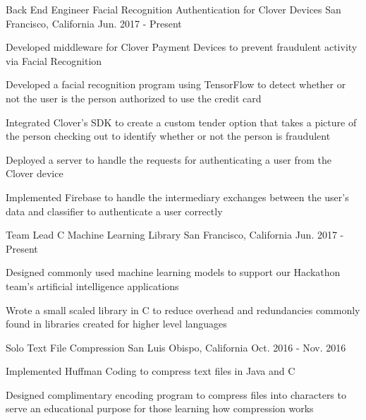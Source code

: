 \begin{cventries}


\cventry
{Back End Engineer} %
{Facial Recognition Authentication for Clover Devices} %
{San Francisco, California} %
{Jun. 2017 - Present} %
{ %
\begin{cvitems}
\item {Developed middleware for Clover Payment Devices to prevent fraudulent activity via Facial Recognition}
\item {Developed a facial recognition program using TensorFlow to detect whether or not the user is the person authorized to use the credit card}
\item {Integrated Clover's SDK to create a custom tender option that takes a picture of the person checking out to identify whether or not the person is fraudulent}
\item {Deployed a server to handle the requests for authenticating a user from the Clover device}
\item {Implemented Firebase to handle the intermediary exchanges between the user's data and classifier to authenticate a user correctly}
\end{cvitems}
}

\cventry
{Team Lead} %
{C Machine Learning Library} %
{San Francisco, California} %
{Jun. 2017 - Present} %
{ %
\begin{cvitems}
\item {Designed commonly used machine learning models to support our Hackathon team's artificial intelligence applications}
\item {Wrote a small scaled library in C to reduce overhead and redundancies commonly found in libraries created for higher level languages}
\end{cvitems}
}

\cventry
{Solo} %
{Text File Compression} %
{San Luis Obispo, California} %
{Oct. 2016 - Nov. 2016} %
{ %
\begin{cvitems}
\item {Implemented Huffman Coding to compress text files in Java and C}
\item {Designed complimentary encoding program to compress files into characters to serve an educational purpose for those learning how compression works}
\end{cvitems}
}



\end{cventries}
